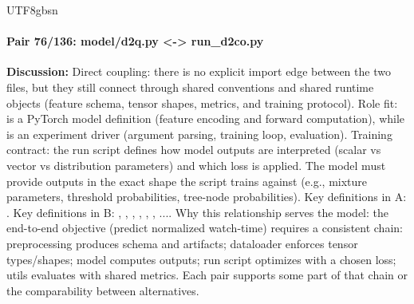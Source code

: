 \documentclass[11pt]{article}
\begin{document}
\begin{CJK*}{UTF8}{gbsn}
\paragraph{Pair 76/136: model/d2q.py <-> run\_d2co.py}
\textbf{Discussion:} Direct coupling: there is no explicit import edge between the two files, but they still connect through shared conventions and shared runtime objects (feature schema, tensor shapes, metrics, and training protocol). Role fit: \texttt{} is a PyTorch model definition (feature encoding and forward computation), while \texttt{} is an experiment driver (argument parsing, training loop, evaluation). Training contract: the run script defines how model outputs are interpreted (scalar vs vector vs distribution parameters) and which loss is applied. The model must provide outputs in the exact shape the script trains against (e.g., mixture parameters, threshold probabilities, tree-node probabilities). Key definitions in A: \texttt{}. Key definitions in B: \texttt{}, \texttt{}, \texttt{}, \texttt{}, \texttt{}, \texttt{}, .... Why this relationship serves the model: the end-to-end objective (predict normalized watch-time) requires a consistent chain: preprocessing produces schema and artifacts; dataloader enforces tensor types/shapes; model computes outputs; run script optimizes with a chosen loss; utils evaluates with shared metrics. Each pair supports some part of that chain or the comparability between alternatives.


\end{CJK*}
\end{document}
